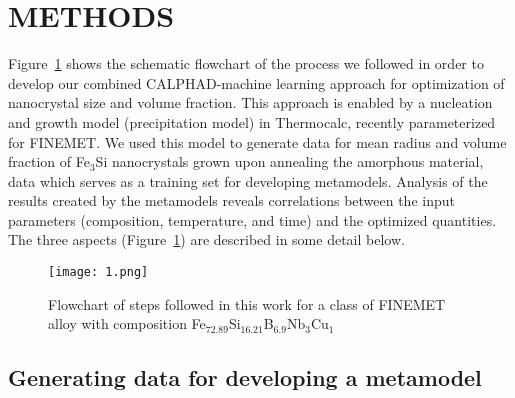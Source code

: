 \section{METHODS}\label{methods}
Figure~\ref{Paper_2_Flowchart} shows the schematic flowchart of the process we followed in order to develop our combined CALPHAD-machine learning approach for optimization
of nanocrystal size and volume fraction.  This approach is enabled by a nucleation and growth model (precipitation model) in Thermocalc,\cite{THERMOCALC_TCPRISMA} recently parameterized for FINEMET.\cite{jha2017FINEMET_CALPHAD} We used this model to generate data for mean radius and volume fraction of Fe$_3$Si nanocrystals grown upon annealing the
amorphous material, data which serves as a training set for  developing metamodels. Analysis of the results created by the metamodels reveals correlations between the input
parameters (composition, temperature, and time) and the optimized quantities. The three aspects (Figure~\ref{Paper_2_Flowchart}) are described in some detail below.


\begin{figure}[ht]
\centering
\texttt{[image: 1.png]}
\caption{Flowchart of steps followed in this work for a class of FINEMET alloy with composition Fe$_{72.89}$Si$_{16.21}$B$_{6.9}$Nb$_{3}$Cu$_{1}$}
\label{Paper_2_Flowchart}
\end{figure}


\subsection{Generating data for developing a metamodel}


